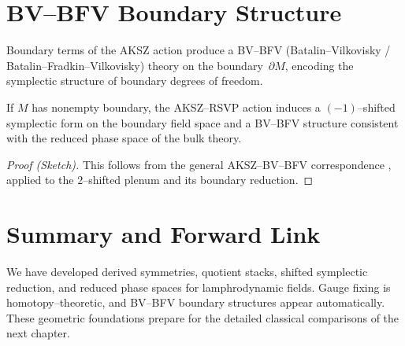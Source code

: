 \section{BV--BFV Boundary Structure}
\label{sec:bv-bfv}

Boundary terms of the AKSZ action produce a BV--BFV (Batalin--Vilkovisky /
Batalin--Fradkin--Vilkovisky) theory on the boundary~$\partial M$,
encoding the symplectic structure of boundary degrees of freedom.

\begin{theorem}
\label{thm:bv-bfv}
If $M$ has nonempty boundary, the AKSZ--RSVP action induces a
$(-1)$--shifted symplectic form on the boundary field space and a
BV--BFV structure consistent with the reduced phase space of the
bulk theory.
\end{theorem}

\begin{proof}[Proof (Sketch)]
This follows from the general AKSZ--BV--BFV correspondence
\cite{CattaneoFelder2012}, applied to the $2$--shifted plenum and its
boundary reduction.
\end{proof}



\section{Summary and Forward Link}
\label{sec:summary13}

We have developed derived symmetries, quotient stacks, shifted
symplectic reduction, and reduced phase spaces for lamphrodynamic
fields.  Gauge fixing is homotopy--theoretic, and BV--BFV boundary
structures appear automatically.  These geometric foundations prepare
for the detailed classical comparisons of the next chapter.

